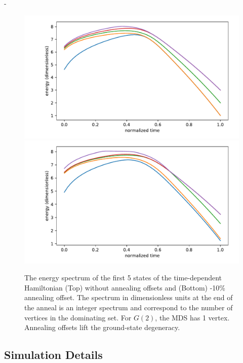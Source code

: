 -\documentclass[prd,twocolumn,tightenlines,preprintnumbers,showpacs,superscriptaddress,notitlepage,nofootinbib,eqsecnum,floatfix,longbibliography]{revtex4}
\begin{document}
\begin{figure}
    \centering
    \includegraphics[width=\columnwidth]{./figures/spectrum.pdf}
    \includegraphics[width=\columnwidth]{./figures/spectrum_offset.pdf}
    \caption{The energy spectrum of the first 5 states of the time-dependent Hamiltonian (Top) without annealing offsets and (Bottom) -10\% annealing offset.
The spectrum in dimensionless units at the end of the anneal is an integer spectrum and correspond to the number of vertices in the dominating set.
For $G(2)$, the MDS has 1 vertex.
Annealing offsets lift the ground-state degeneracy.}
    \label{fig:spectrum}
\end{figure}

\subsection{Simulation Details}

\end{document}
